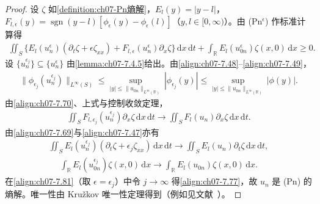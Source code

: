 \documentclass[../../main.tex]{subfiles}%
\begin{document}
\begin{proof}
设 $\zeta$ 如\cref{definition:ch07-Pn熵解}，$E_l(y)=|y-l|$，$F_{l,\epsilon}(y)=\operatorname{sgn}(y-l)[\phi_\epsilon(y)-\phi_\epsilon(l)]$（$y,l\in[0,\infty)$）。由 (Pn$^\epsilon$) 作标准计算得
\begin{align}
\iint_S\{E_l(u_n^\epsilon)(\partial_t\zeta+\epsilon\zeta_{xx})+F_{l,\epsilon}(u_n^\epsilon)\partial_x\zeta\}\,\mathrm{d}x\,\mathrm{d}t
+\int_{\mathbb{R}}E_l(u_{0n}^\epsilon)\zeta(x,0)\,\mathrm{d}x\geqslant0. \label{align:ch07-7.81}
\end{align}
设 $\{u_n^{\epsilon_j}\}\subseteq\{u_n^\epsilon\}$ 由\cref{lemma:ch07-7.4.5}给出。由\eqref{align:ch07-7.48}--\eqref{align:ch07-7.49}，
\begin{align*}
\|\phi_{\epsilon_j}(u_n^{\epsilon_j})\|_{L^\infty(S)}
\leqslant\sup_{|y|\leqslant\|u_{0n}\|_{L^\infty(\mathbb{R})}}|\phi_{\epsilon_j}(y)|
\leqslant\sup_{|y|\leqslant\|u_{0n}\|_{L^\infty(\mathbb{R})}}|\phi(y)|.
\end{align*}
由\eqref{align:ch07-7.70}、上式与控制收敛定理，
\begin{align*}
\iint_S F_{l,\epsilon_j}(u_n^{\epsilon_j})\partial_x\zeta\,\mathrm{d}x\,\mathrm{d}t
\to\iint_S F_l(u_n)\partial_x\zeta\,\mathrm{d}x\,\mathrm{d}t.
\end{align*}
由\eqref{align:ch07-7.69}与\eqref{align:ch07-7.47}亦有
\begin{align*}
\iint_S E_l(u_n^{\epsilon_j})(\partial_t\zeta+\epsilon_j\zeta_{xx})\,\mathrm{d}x\,\mathrm{d}t
\to\iint_S E_l(u_n)\partial_t\zeta\,\mathrm{d}x\,\mathrm{d}t,
\end{align*}
\begin{align*}
\int_{\mathbb{R}}E_l(u_{0n}^{\epsilon_j})\zeta(x,0)\,\mathrm{d}x\to\int_{\mathbb{R}}E_l(u_{0n})\zeta(x,0)\,\mathrm{d}x.
\end{align*}
在\eqref{align:ch07-7.81}（取 $\epsilon=\epsilon_j$）中令 $j\to\infty$ 得\eqref{align:ch07-7.77}，故 $u_n$ 是 (Pn) 的熵解。唯一性由 Kružkov 唯一性定理得到（例如见文献~\cite{ref91}）。


\end{proof}
\end{document}
